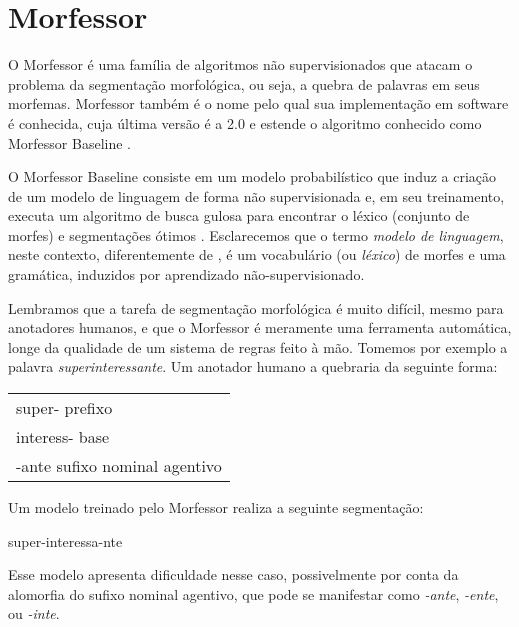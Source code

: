 \documentclass[cic,tc]{iiufrgs}
\begin{document}
\section{Morfessor}
O Morfessor \cite{creutz-lagus-2002-unsupervised,Creutz04inductionof,Creutz05inducingthe,Creutz05unsupervisedmorpheme,creutz-lagus-2007-unsupervised} é uma família de algoritmos não supervisionados que atacam o problema da segmentação morfológica, ou seja, a quebra de palavras em seus morfemas. Morfessor também é o nome pelo qual sua implementação em software é conhecida, cuja última versão é a 2.0 \cite{Virpioja2013Morfessor2P} e estende o algoritmo conhecido como Morfessor Baseline \cite{creutz-lagus-2002-unsupervised, Creutz05unsupervisedmorpheme}.

O Morfessor Baseline consiste em um modelo probabilístico que induz a criação de um modelo de linguagem de forma não supervisionada e, em seu treinamento, executa um algoritmo de busca gulosa para encontrar o léxico (conjunto de morfes) e segmentações ótimos \cite{Creutz05unsupervisedmorpheme}. Esclarecemos que o termo \emph{modelo de linguagem}, neste contexto, diferentemente de \citet{a-neural-probabilistic-lm}, é um vocabulário (ou \emph{léxico}) de morfes e uma gramática, induzidos por aprendizado não-supervisionado.


Lembramos que a tarefa de segmentação morfológica é muito difícil, mesmo para anotadores humanos, e que o Morfessor é meramente uma ferramenta automática, longe da qualidade de um sistema de regras feito à mão. Tomemos por exemplo a palavra \emph{superinteressante}. Um anotador humano a quebraria da seguinte forma:

\begin{center}
    \begin{tabular}{l}
         super- \rightarrow{} prefixo \\
         interess- \rightarrow{} base \\
         -ante \rightarrow{} sufixo nominal agentivo
    \end{tabular}
\end{center}

Um modelo treinado pelo Morfessor realiza a seguinte segmentação:

\begin{center}
    super-interessa-nte
\end{center}

Esse modelo  apresenta dificuldade nesse caso, possivelmente por conta da alomorfia do sufixo nominal agentivo, que pode se manifestar como \emph{-ante}, \emph{-ente}, ou \emph{-inte}.
\end{document}
